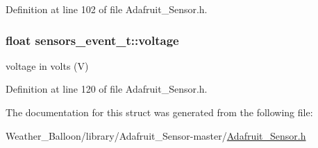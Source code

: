 Definition at line 102 of file Adafruit\+\_\+\+Sensor.\+h.

\subsubsection[{\texorpdfstring{voltage}{voltage}}]{\setlength{\rightskip}{0pt plus 5cm}float sensors\+\_\+event\+\_\+t\+::voltage}\hypertarget{structsensors__event__t_ab01b52f6b83f390a6370d319ded97b28}{}\label{structsensors__event__t_ab01b52f6b83f390a6370d319ded97b28}
voltage in volts (V) 

Definition at line 120 of file Adafruit\+\_\+\+Sensor.\+h.



The documentation for this struct was generated from the following file\+:\begin{DoxyCompactItemize}
\item 
Weather\+\_\+\+Balloon/library/\+Adafruit\+\_\+\+Sensor-\/master/\hyperlink{_adafruit___sensor_8h}{Adafruit\+\_\+\+Sensor.\+h}\end{DoxyCompactItemize}

